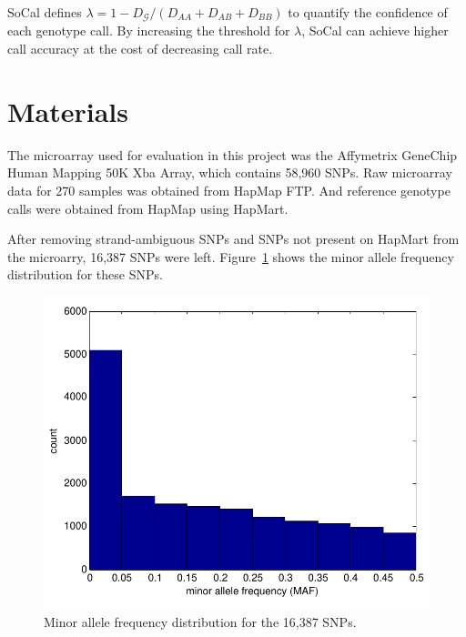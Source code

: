 \documentclass{scrartcl}
\begin{document}
\par
SoCal defines $\lambda=1-D_{\mathcal{G}}/(D_{AA}+D_{AB}+D_{BB})$ to quantify
the confidence of each genotype call.
By increasing the threshold for $\lambda$, SoCal can achieve higher call
accuracy at the cost of decreasing call rate.





\section{Materials}

\par
The microarray used for evaluation in this project was the Affymetrix GeneChip
Human Mapping 50K Xba Array, which contains 58,960 SNPs.
Raw microarray data for 270 samples was obtained from HapMap FTP.
And reference genotype calls were obtained from HapMap using HapMart.

\par
After removing strand-ambiguous SNPs and SNPs not present on HapMart from
the microarry, 16,387 SNPs were left.
Figure~\ref{fig:data_maf_dist} shows the minor allele frequency distribution
for these SNPs.

\begin{figure}[H]
\centering
\includegraphics[scale=0.75]
{data_figs/maf_dist.pdf}
\caption{Minor allele frequency distribution for the 16,387 SNPs.}
\label{fig:data_maf_dist}
\end{figure}
\end{document}
